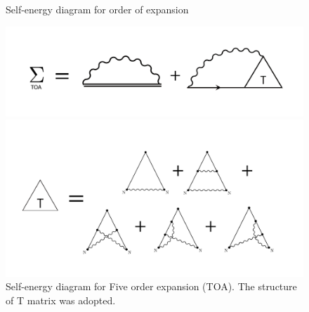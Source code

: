 \documentclass{article}[12pt]
\numberwithin{equation}{section}
\begin{document}
\begin{spacing}{1.5}
\begin{spacing}{1.5}
\begin{figure}[H]
  \caption{Self-energy diagram for order of expansion}
\end{figure}
\begin{figure}[H]
  \centerline{\includegraphics[width=12cm]{TexFigure/TOA_se.png}}
  \centerline{\includegraphics[width=12cm]{TexFigure/TOA_tmat.png}}
  \caption{Self-energy diagram for Five order expansion (TOA). The structure of T matrix was adopted.}
\end{figure}
\end{spacing}
\pagebreak
\end{spacing}
\end{document}
